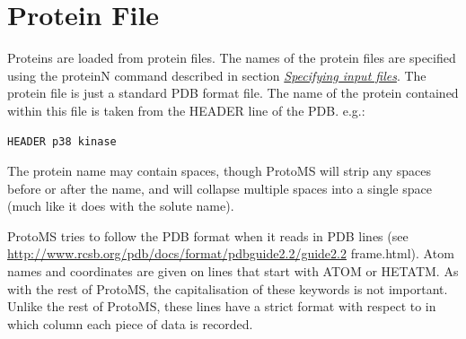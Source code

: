 \documentclass[letterpaper,10pt,english]{sphinxmanual}
\begin{document}
\section{Protein File}
\label{protoms:protein-file}\label{protoms:protpdb}
Proteins are loaded from protein files. The names of the protein files are specified using the proteinN command described in section {\hyperref[protoms:incmd]{\emph{Specifying input files}}}. The protein file is just a standard PDB format file. The name of the protein contained within this file is taken from the HEADER line of the PDB. e.g.:

\begin{Verbatim}[commandchars=\\\{\}]
HEADER p38 kinase
\end{Verbatim}

The protein name may contain spaces, though ProtoMS will strip any spaces before or after the name, and will collapse multiple spaces into a single space (much like it does with the solute name).

ProtoMS tries to follow the PDB format when it reads in PDB lines (see \href{http://www.rcsb.org/pdb/docs/format/pdbguide2.2/guide2.2}{http://www.rcsb.org/pdb/docs/format/pdbguide2.2/guide2.2} frame.html). Atom names and coordinates are given on lines that start with ATOM or HETATM. As with the rest of ProtoMS, the capitalisation of these keywords is not important. Unlike the rest of ProtoMS, these lines have a strict format with respect to in which column each piece of data is recorded.
\end{document}
